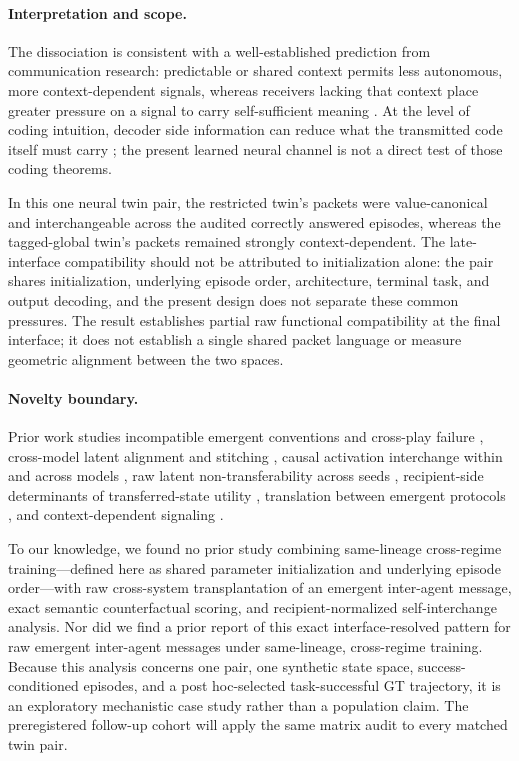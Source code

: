 \documentclass[11pt]{article}
\begin{document}
\paragraph{Interpretation and scope.}
The dissociation is consistent with a well-established prediction from communication research: predictable or shared context permits less autonomous, more context-dependent signals, whereas receivers lacking that context place greater pressure on a signal to carry self-sufficient meaning \citep{winters2018contextual,piantadosi2012ambiguity,glowka2024context,gualdoni2024bridging}. At the level of coding intuition, decoder side information can reduce what the transmitted code itself must carry \citep{slepian1973noiseless,wyner1976rate}; the present learned neural channel is not a direct test of those coding theorems.

In this one neural twin pair, the restricted twin's packets were value-canonical and interchangeable across the audited correctly answered episodes, whereas the tagged-global twin's packets remained strongly context-dependent. The late-interface compatibility should not be attributed to initialization alone: the pair shares initialization, underlying episode order, architecture, terminal task, and output decoding, and the present design does not separate these common pressures. The result establishes partial raw functional compatibility at the final interface; it does not establish a single shared packet language or measure geometric alignment between the two spaces.

\paragraph{Novelty boundary.}
Prior work studies incompatible emergent conventions and cross-play failure \citep{hu2020otherplay,bullard2021qed,wolski2026crossplay}, cross-model latent alignment and stitching \citep{lenc2014equivariance,bansal2021stitching,moschella2022relative,peng2026statebridge}, causal activation interchange within and across models \citep{geiger2021causal,grant2025mas,cardenas2026causal}, raw latent non-transferability across seeds \citep{okatan2025keys}, recipient-side determinants of transferred-state utility \citep{li2026memory}, translation between emergent protocols \citep{levy2025translation}, and context-dependent signaling \citep{winters2018contextual,glowka2024context,gualdoni2024bridging}.

To our knowledge, we found no prior study combining same-lineage cross-regime training---defined here as shared parameter initialization and underlying episode order---with raw cross-system transplantation of an emergent inter-agent message, exact semantic counterfactual scoring, and recipient-normalized self-interchange analysis. Nor did we find a prior report of this exact interface-resolved pattern for raw emergent inter-agent messages under same-lineage, cross-regime training. Because this analysis concerns one pair, one synthetic state space, success-conditioned episodes, and a post hoc-selected task-successful GT trajectory, it is an exploratory mechanistic case study rather than a population claim. The preregistered follow-up cohort will apply the same matrix audit to every matched twin pair.



\end{document}
